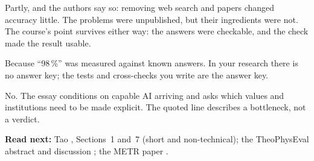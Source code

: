 \begin{qa}
Partly, and the authors say so: removing web search and papers changed accuracy little.
The problems were unpublished, but their ingredients were not. The course's point
survives either way: the answers were checkable, and the check made the result usable.

Because ``98\,\%'' was measured against known answers. In your research there is no
answer key; the tests and cross-checks you write are the answer key.

No. The essay conditions on capable AI arriving and asks which values and institutions
need to be made explicit. The quoted line describes a bottleneck, not a verdict.
\end{qa}

\textbf{Read next:} Tao , Sections~1 and~7 (short and non-technical); the
TheoPhysEval abstract and discussion ; the METR paper .
